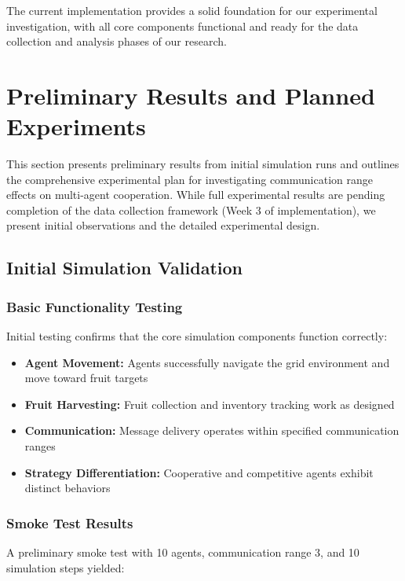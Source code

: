 \documentclass[12pt,a4paper]{article}
\begin{document}
The current implementation provides a solid foundation for our experimental investigation, with all core components functional and ready for the data collection and analysis phases of our research.

\section{Preliminary Results and Planned Experiments}
\label{sec:results}

This section presents preliminary results from initial simulation runs and outlines the comprehensive experimental plan for investigating communication range effects on multi-agent cooperation. While full experimental results are pending completion of the data collection framework (Week 3 of implementation), we present initial observations and the detailed experimental design.

\subsection{Initial Simulation Validation}

\subsubsection{Basic Functionality Testing}

Initial testing confirms that the core simulation components function correctly:

\begin{itemize}
    \item \textbf{Agent Movement:} Agents successfully navigate the grid environment and move toward fruit targets
    \item \textbf{Fruit Harvesting:} Fruit collection and inventory tracking work as designed
    \item \textbf{Communication:} Message delivery operates within specified communication ranges
    \item \textbf{Strategy Differentiation:} Cooperative and competitive agents exhibit distinct behaviors
\end{itemize}

\subsubsection{Smoke Test Results}

A preliminary smoke test with 10 agents, communication range 3, and 10 simulation steps yielded:
\end{document}
